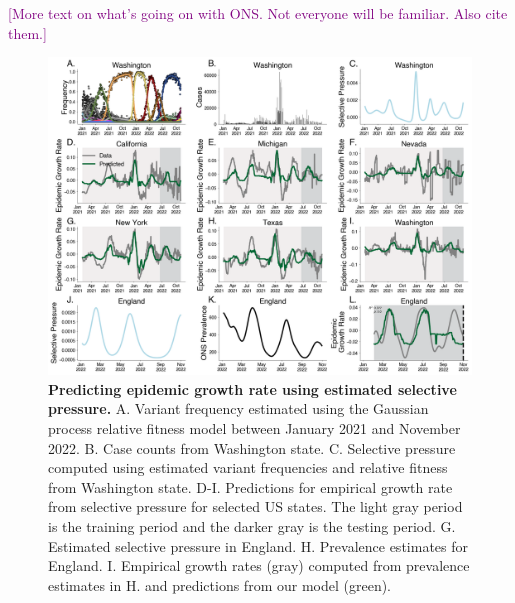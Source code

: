 \documentclass[11pt,oneside,letterpaper]{article}
\def\tbc#1{\textcolor{purple}{[#1]}}
\begin{document}
\tbc{More text on what's going on with ONS. Not everyone will be familiar. Also cite them.}

\begin{figure}[h]
    \centering
    \includegraphics[width=1.0\linewidth]{./figures/selective_pressure_prediction.png}
    \caption{
      \textbf{Predicting epidemic growth rate using estimated selective pressure.}
      A. Variant frequency estimated using the Gaussian process relative fitness model between January 2021 and November 2022.
      B. Case counts from Washington state.
      C. Selective pressure computed using estimated variant frequencies and relative fitness from Washington state.
      D-I. Predictions for empirical growth rate from selective pressure for selected US states.
      The light gray period is the training period and the darker gray is the testing period.
      G. Estimated selective pressure in England.
      H. Prevalence estimates for England.
      I. Empirical growth rates (gray) computed from prevalence estimates in H. and predictions from our model (green).
    }
    \label{fig:selective_pressure_prediction}
\end{figure}
\end{document}
